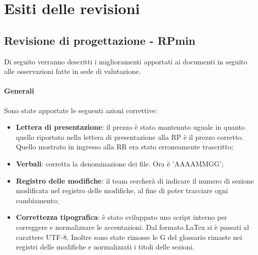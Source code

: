 \section{Esiti delle revisioni}
\subsection{Revisione di progettazione - RPmin}
Di seguito verranno descritti i miglioramenti apportati ai documenti in seguito alle osservazioni fatte in sede di valutazione.
\paragraph*{Generali}
Sono state apportate le seguenti azioni correttive:
\begin{itemize}
\item \textbf{Lettera di presentazione}: il prezzo è stato mantenuto uguale in quanto quello riportato nella lettera di presentazione alla RP è il prezzo corretto. Quello mostrato in ingresso alla RR era stato erroneamente trascritto;
\item \textbf{Verbali}: corretta la denominazione dei file. Ora è 'AAAAMMGG';
\item \textbf{Registro delle modifiche}: il team cercherà di indicare il numero di sezione modificata nel registro delle modifiche, al fine di poter tracciare ogni cambiamento;
\item \textbf{Correttezza tipografica}: è stato sviluppato uno script interno per correggere e normalizzare le accentazioni. Dal formato LaTex si è passati al carattere UTF-8. Inoltre sono state rimosse le G del glossario rimaste nei registri delle modifiche e normalizzati i titoli delle sezioni.
\end{itemize}

